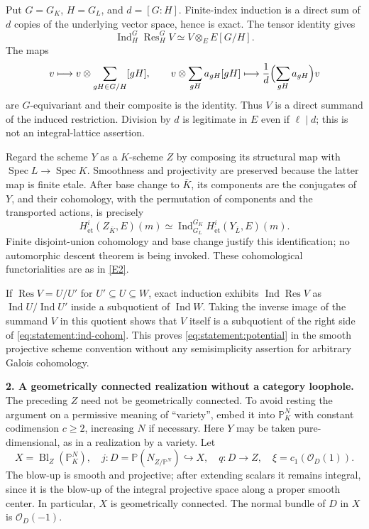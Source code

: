 \documentclass[11pt,a4paper]{article}
\newcommand{\PP}{\mathbb P}
\newcommand{\eref}[2]{\hyperlink{extra:#1:#2}{[E#2]}}
\numberwithin{equation}{section}
\begin{document}
Put $G=G_K$, $H=G_L$, and $d=[G:H]$. Finite-index induction is a direct sum
of $d$ copies of the underlying vector space, hence is exact. The tensor
identity gives
\[
 \operatorname{Ind}_H^G\operatorname{Res}_H^G V
       \simeq V\otimes_E E[G/H].
\]
The maps
\[
 v\longmapsto v\otimes\sum_{gH\in G/H}[gH],\qquad
 v\otimes\sum_{gH}a_{gH}[gH]\longmapsto
          \frac{1}{d}\Bigl(\sum_{gH}a_{gH}\Bigr)v
\]
are $G$-equivariant and their composite is the identity. Thus $V$ is a
direct summand of the induced restriction. Division by $d$ is legitimate in
$E$ even if $\ell\mid d$; this is not an integral-lattice assertion.

Regard the scheme $Y$ as a $K$-scheme $Z$ by composing its structural map
with $\operatorname{Spec}L\to\operatorname{Spec}K$. Smoothness and
projectivity are preserved because the latter map is finite etale.
After base change to $\bar K$, its components are the conjugates of $Y$,
and their cohomology, with the permutation of components and the transported
actions, is precisely
\begin{equation}\label{eq:statement:ind-cohom}
 H^i_{\mathrm{\acute et}}(Z_{\bar K},E)(m)
 \simeq \operatorname{Ind}_{G_L}^{G_K}
       H^i_{\mathrm{\acute et}}(Y_{\bar L},E)(m).
\end{equation}
Finite disjoint-union cohomology and base change justify this identification;
no automorphic descent theorem is being invoked. These cohomological
functorialities are as in \eref{statement}{2}.

If $\operatorname{Res}V=U/U'$ for $U'\subseteq U\subseteq W$, exact
induction exhibits $\operatorname{Ind}\operatorname{Res}V$ as
$\operatorname{Ind}U/\operatorname{Ind}U'$ inside a subquotient of
$\operatorname{Ind}W$. Taking the inverse image of the summand $V$ in this
quotient shows that $V$ itself is a subquotient of the right side of
\eqref{eq:statement:ind-cohom}. This proves \eqref{eq:statement:potential} in the smooth
projective scheme convention without any semisimplicity assertion for
arbitrary Galois cohomology.

\textbf{2. A geometrically connected realization without a category loophole.}
The preceding $Z$ need not be geometrically connected. To avoid resting the
argument on a permissive meaning of ``variety'', embed it into $\PP^N_K$
with constant codimension $c\ge2$, increasing $N$ if necessary. Here $Y$
may be taken pure-dimensional, as in a realization by a variety. Let
\[
 X=\operatorname{Bl}_{Z}(\PP^N_K),\quad
 j:D=\PP(N_{Z/\PP^N})\hookrightarrow X,\quad q:D\to Z,
 \quad \xi=c_1(\mathcal O_D(1)).
\]
The blow-up is smooth and projective; after extending scalars it remains
integral, since it is the blow-up of the integral projective space along a
proper smooth center. In particular, $X$ is geometrically connected.
The normal bundle of $D$ in $X$ is $\mathcal O_D(-1)$.
\end{document}
